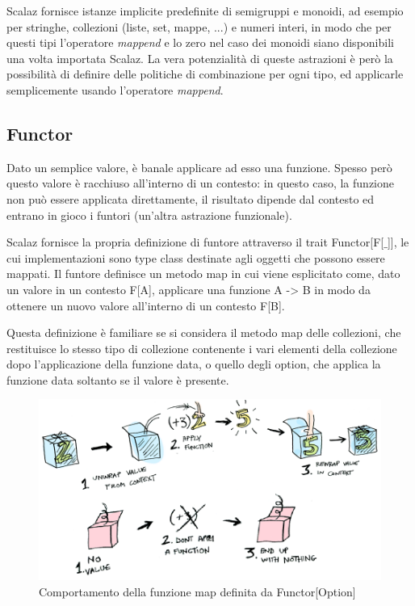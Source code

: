 Scalaz fornisce istanze implicite predefinite di semigruppi e monoidi, ad esempio per stringhe, collezioni (liste, set, mappe, ...) e numeri interi, in modo che per questi tipi l'operatore \textit{mappend} e lo zero nel caso dei monoidi siano disponibili una volta importata Scalaz. La vera potenzialità di queste astrazioni è però la possibilità di definire delle politiche di combinazione per ogni tipo, ed applicarle semplicemente usando l'operatore \textit{mappend}.



\subsection{Functor}

Dato un semplice valore, è banale applicare ad esso una funzione. Spesso però questo valore è racchiuso all'interno di un contesto: in questo caso, la funzione non può essere applicata direttamente, il risultato dipende dal contesto ed entrano in gioco i funtori (un'altra astrazione funzionale).

Scalaz fornisce la propria definizione di funtore attraverso il trait Functor[F[$\_$]], le cui implementazioni sono type class destinate agli oggetti che possono essere mappati. Il funtore definisce un metodo map in cui viene esplicitato come, dato un valore in un contesto F[A], applicare una funzione A -> B in modo da ottenere un nuovo valore all'interno di un contesto F[B].

Questa definizione è familiare se si considera il metodo map delle collezioni, che restituisce lo stesso tipo di collezione contenente i vari elementi della collezione dopo l'applicazione della funzione data, o quello degli option, che applica la funzione data soltanto se il valore è presente.

\begin{figure}[th]
\centering
\includegraphics[scale=0.65]{images/functor}
\decoRule
\caption[functor]{Comportamento della funzione map definita da Functor[Option] \cite{FunctorsApplicativesMonads}}
\end{figure}

